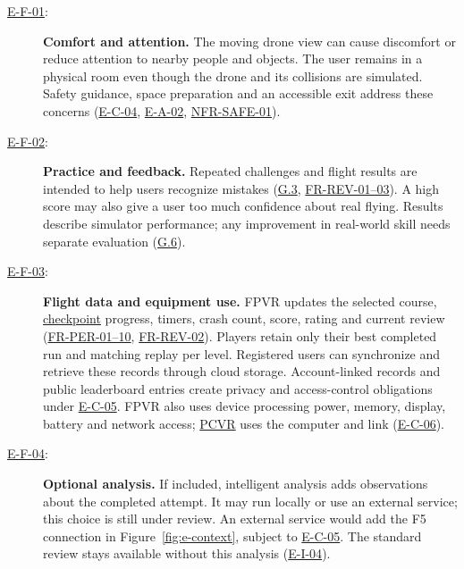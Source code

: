 \documentclass[12pt]{article}
\begin{document}
\begin{description}
\item[{\hyperref[et-safety]{E-F-01}:}]\label{ef-attention}
\textbf{Comfort and attention.}
The moving drone view can cause discomfort or reduce attention to nearby
people and objects. The user remains in a physical room even though the drone
and its collisions are simulated. Safety guidance, space preparation and an
accessible exit address these concerns (\hyperref[ec-safety]{E-C-04},
\hyperref[ea-space]{E-A-02}, \hyperref[sec:s2-nfr]{NFR-SAFE-01}).

\item[{\hyperref[et-scope]{E-F-02}:}]\label{ef-training}
\textbf{Practice and feedback.}
Repeated challenges and flight results are intended to help users recognize
mistakes (\hyperref[g3]{G.3}, \hyperref[sec:s2-review]{FR-REV-01--03}).
A high score may also give a user too much confidence about real flying.
Results describe simulator performance; any improvement in real-world skill
needs separate evaluation (\hyperref[g6]{G.6}).

\item[{\hyperref[et-release]{E-F-03}:}]\label{ef-data}
\textbf{Flight data and equipment use.}
FPVR updates the selected course, \hyperlink{glos:Checkpoint}{checkpoint} progress, timers, crash count,
score, rating and current review (\hyperref[sec:s2-performance]{FR-PER-01--10},
\hyperref[sec:s2-review]{FR-REV-02}). Players retain only their best completed run
and matching replay per level. Registered users can synchronize and retrieve
these records through cloud storage. Account-linked
records and public leaderboard entries create privacy and access-control
obligations under \hyperref[ec-release]{E-C-05}. FPVR also uses device processing
power, memory, display, battery and network access; \hyperlink{glos:PCVR}{PCVR} uses the computer and
link (\hyperref[ec-resources]{E-C-06}).

\item[{\hyperref[et-review]{E-F-04}:}]\label{ef-analysis}
\textbf{Optional analysis.}
If included, intelligent analysis adds observations about the completed attempt.
It may run locally or use an external service; this choice is still under
review. An external service would add the F5 connection in
Figure~\ref{fig:e-context}, subject to \hyperref[ec-release]{E-C-05}.
The standard review stays available without this analysis
(\hyperref[ei-review]{E-I-04}).
\end{description}
\end{document}
